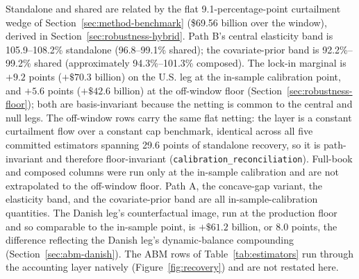 \documentclass[12pt]{article}
\begin{document}
\begin{table}[H]
\begin{threeparttable}
\begin{tablenotes}[flushleft]
\item Standalone and shared are related by the flat 9.1-percentage-point curtailment wedge of Section~\ref{sec:method-benchmark} (\$69.56 billion over the window), derived in Section~\ref{sec:robustness-hybrid}. Path B's central elasticity band is 105.9--108.2\% standalone (96.8--99.1\% shared); the covariate-prior band is 92.2\%--99.2\% shared (approximately 94.3\%--101.3\% composed). The lock-in marginal is $+9.2$ points ($+\$70.3$ billion) on the U.S. leg at the in-sample calibration point, and $+5.6$ points ($+\$42.6$ billion) at the off-window floor (Section~\ref{sec:robustness-floor}); both are basis-invariant because the netting is common to the central and null legs. The off-window rows carry the same flat netting: the layer is a constant curtailment flow over a constant cap benchmark, identical across all five committed estimators spanning 29.6 points of standalone recovery, so it is path-invariant and therefore floor-invariant (\texttt{calibration\_reconciliation}). Full-book and composed columns were run only at the in-sample calibration and are not extrapolated to the off-window floor. Path A, the concave-gap variant, the elasticity band, and the covariate-prior band are all in-sample-calibration quantities. The Danish leg's counterfactual image, run at the production floor and so comparable to the in-sample point, is $+\$61.2$ billion, or 8.0 points, the difference reflecting the Danish leg's dynamic-balance compounding (Section~\ref{sec:abm-danish}). The ABM rows of Table~\ref{tab:estimators} run through the accounting layer natively (Figure~\ref{fig:recovery}) and are not restated here.
\end{tablenotes}
\end{threeparttable}
\end{table}
\end{document}
